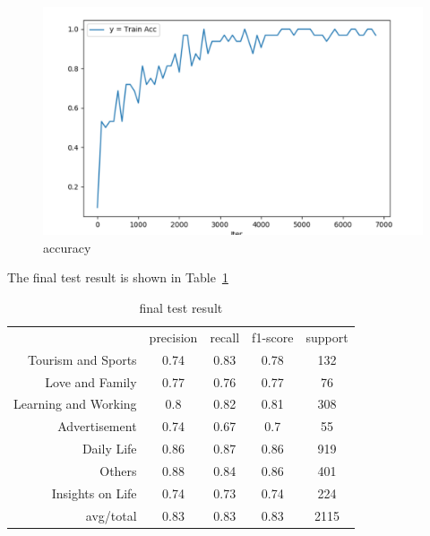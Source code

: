 \documentclass[10pt,twocolumn,letterpaper]{article}
\begin{document}
    \begin{figure}[t]
    \begin{center}
    \includegraphics[width=\linewidth]{3123}
    \end{center}
    \vspace{-0.5cm}
       \caption{accuracy}
       \label{fig:3123}
    \end{figure}
    The final test result is shown in Table~\ref{testresult}
    \setlength{\tabcolsep}{4pt}
    \begin{table}
    \newcommand{\tabincell}[2]{\begin{tabular}{@{}#1@{}}#2\end{tabular}}
    \begin{center}
    \caption{final test result}
    \label{testresult}
    \begin{tabular}{rcccc}
    \hline\noalign{\smallskip}
     & precision & recall & f1-score & support \\
    \noalign{\smallskip}
    \hline
    \noalign{\smallskip}
    Tourism and Sports & 0.74 & 0.83 & 0.78 & 132\\
    Love and Family & 0.77 & 0.76 & 0.77 & 76\\
    Learning and Working & 0.8 & 0.82 & 0.81 & 308\\
    Advertisement & 0.74 & 0.67 & 0.7 & 55\\
    Daily Life & 0.86 & 0.87 & 0.86 & 919\\
    Others & 0.88 & 0.84 & 0.86 & 401\\
    Insights on Life & 0.74 & 0.73 & 0.74 & 224\\
    avg/total & 0.83 & 0.83 & 0.83 & 2115\\
    \hline
    \end{tabular}
    \end{center}
    \end{table}
\end{document}
